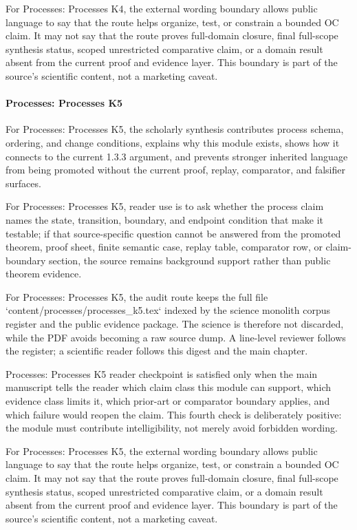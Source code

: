 For Processes: Processes K4, the external wording boundary allows public language to say that the route helps organize, test, or constrain a bounded OC claim. It may not say that the route proves full-domain closure, final full-scope synthesis status, scoped unrestricted comparative claim, or a domain result absent from the current proof and evidence layer. This boundary is part of the source's scientific content, not a marketing caveat.


\paragraph{Processes: Processes K5}

For Processes: Processes K5, the scholarly synthesis contributes process schema, ordering, and change conditions, explains why this module exists, shows how it connects to the current 1.3.3 argument, and prevents stronger inherited language from being promoted without the current proof, replay, comparator, and falsifier surfaces.


For Processes: Processes K5, reader use is to ask whether the process claim names the state, transition, boundary, and endpoint condition that make it testable; if that source-specific question cannot be answered from the promoted theorem, proof sheet, finite semantic case, replay table, comparator row, or claim-boundary section, the source remains background support rather than public theorem evidence.


For Processes: Processes K5, the audit route keeps the full file `content/processes/processes\_k5.tex` indexed by the science monolith corpus register and the public evidence package. The science is therefore not discarded, while the PDF avoids becoming a raw source dump. A line-level reviewer follows the register; a scientific reader follows this digest and the main chapter.


Processes: Processes K5 reader checkpoint is satisfied only when the main manuscript tells the reader which claim class this module can support, which evidence class limits it, which prior-art or comparator boundary applies, and which failure would reopen the claim. This fourth check is deliberately positive: the module must contribute intelligibility, not merely avoid forbidden wording.


For Processes: Processes K5, the external wording boundary allows public language to say that the route helps organize, test, or constrain a bounded OC claim. It may not say that the route proves full-domain closure, final full-scope synthesis status, scoped unrestricted comparative claim, or a domain result absent from the current proof and evidence layer. This boundary is part of the source's scientific content, not a marketing caveat.


